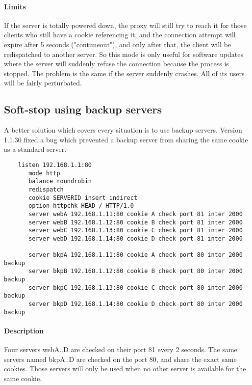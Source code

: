 \paragraph{Limits}

If the server is totally powered down, the proxy will still try to reach it
for those clients who still have a cookie referencing it, and the connection
attempt will expire after 5 seconds ("contimeout"), and only after that, the
client will be redispatched to another server. So this mode is only useful
for software updates where the server will suddenly refuse the connection
because the process is stopped. The problem is the same if the server suddenly
crashes. All of its users will be fairly perturbated.

\subsection{Soft-stop using backup servers}

A better solution which covers every situation is to use backup servers.
Version 1.1.30 fixed a bug which prevented a backup server from sharing
the same cookie as a standard server.

\begin{verbatim}
    listen 192.168.1.1:80
       mode http
       balance roundrobin
       redispatch
       cookie SERVERID insert indirect
       option httpchk HEAD / HTTP/1.0
       server webA 192.168.1.11:80 cookie A check port 81 inter 2000
       server webB 192.168.1.12:80 cookie B check port 81 inter 2000
       server webC 192.168.1.13:80 cookie C check port 81 inter 2000
       server webD 192.168.1.14:80 cookie D check port 81 inter 2000

       server bkpA 192.168.1.11:80 cookie A check port 80 inter 2000 backup
       server bkpB 192.168.1.12:80 cookie B check port 80 inter 2000 backup
       server bkpC 192.168.1.13:80 cookie C check port 80 inter 2000 backup
       server bkpD 192.168.1.14:80 cookie D check port 80 inter 2000 backup
\end{verbatim}

\paragraph{Description}

Four servers webA..D are checked on their port 81 every 2 seconds. The same
servers named bkpA..D are checked on the port 80, and share the exact same
cookies. Those servers will only be used when no other server is available
for the same cookie.

